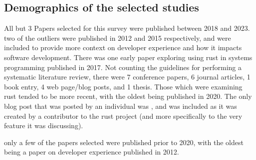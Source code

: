 \documentclass[conference]{IEEEtran}
\begin{document}
\subsection{Demographics of the selected studies}
{All but 3 Papers selected for this survey were published between 2018 and 2023. two of the outliers were published in 2012\cite{fagerholmDeveloperExperienceConcept2012} and 2015\cite{graziotin2015you} respectively,
    and were included to provide more context on developer experience and how it impacts software development. There was one early paper exploring using rust
    in systems programming\cite{balasubramanianSystemProgrammingRust2017} published in 2017.
    Not counting the guidelines for performing a systematic literature review\cite{GuidelinesPerformingSystematic}, there were
    7 conference papers, 6 journal articles, 1 book entry, 4 web page/blog posts, and 1 thesis. Those which were
    examining rust tended to be more recent, with the oldest being published in 2020\cite{sudwojRustProgrammingLanguage2020}. The only blog post that was posted by
    an individual was \cite{saoirseWhyAsyncRust2023}, and was included as it was created by a contributor to the rust project (and more specifically to the very feature it was discussing).

    only a few of the papers selected were published prior to 2020, with the oldest being a paper on developer experience published in 2012\cite{fagerholmDeveloperExperienceConcept2012}.\\

    \startchronology[startyear=2012,stopyear=2020,height=1pt,  startdate=true, stopdate=true, arrow=false, width=\hsize, box=false]
    \stopchronology

}
\end{document}
